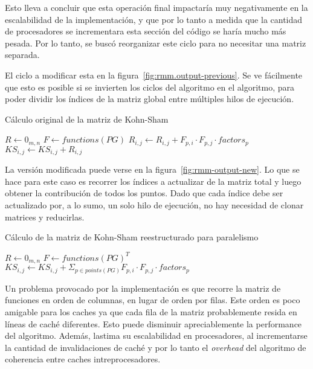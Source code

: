 Esto lleva a concluir que esta operaci\'on final impactar\'ia muy
negativamente en la escalabilidad de la implementaci\'on, y que por lo tanto a
medida que la cantidad de procesadores se incrementara esta secci\'on del
c\'odigo se har\'ia mucho m\'as pesada. Por lo tanto, se busc\'o reorganizar
este ciclo para no necesitar una matriz separada.

El ciclo a modificar esta en la figura~\ref{fig:rmm.output-previous}.
Se ve f\'acilmente que esto es posible si se invierten los ciclos del algoritmo en
el algoritmo, para poder dividir los \'indices de la matriz global entre m\'ultiples
hilos de ejecuci\'on.

\begin{algorithm}[H]
    \centering
    \label{algo:rmm-output-previous}
    \caption{C\'alculo original de la matriz de Kohn-Sham}
    \begin{algorithmic}
        \State $R \gets 0_{m,n}$
        \State $F \gets functions(PG)$
            \State $R_{i,j} \gets R_{i,j} + F_{p,i} \cdot F_{p,j} \cdot factors_{p}$
            \EndFor
        \EndFor
            \State $KS_{i,j} \gets KS_{i,j} + R_{i,j}$
        \EndFor
    \end{algorithmic}
\end{algorithm}

La versi\'on modificada puede verse en la figura~\ref{fig:rmm-output-new}. Lo que
se hace para este caso es recorrer los \'indices a actualizar de la matriz total
y luego obtener la contribuci\'on de todos los puntos. Dado que cada \'indice debe
ser actualizado por, a lo sumo, un solo hilo de ejecuci\'on, no hay necesidad de
clonar matrices y reducirlas.

\begin{algorithm}[H]
    \centering
    \label{algo:rmm-output-new}
    \caption{C\'alculo de la matriz de Kohn-Sham reestructurado para paralelismo}
    \begin{algorithmic}
        \State $R \gets 0_{m,n}$
        \State $F \gets functions(PG)^T$
            \State $KS_{i,j} \gets KS_{i,j} + \displaystyle \Sigma_{p \in points(PG)} F_{p,i} \cdot F_{p,j} \cdot factors_{p}$
        \EndFor
    \end{algorithmic}
\end{algorithm}

Un problema provocado por la implementaci\'on es que recorre la matriz de funciones
en orden de columnas, en lugar de orden por filas. Este orden es poco amigable
para los caches ya que cada fila de la matriz probablemente resida en l\'ineas de
cach\'e diferentes. Esto puede disminuir apreciablemente la performance del algoritmo.
Adem\'as, lastima su escalabilidad en procesadores, al incrementarse la cantidad de
invalidaciones de cach\'e y por lo tanto el \textit{overhead} del algoritmo de
coherencia entre caches intreprocesadores.

